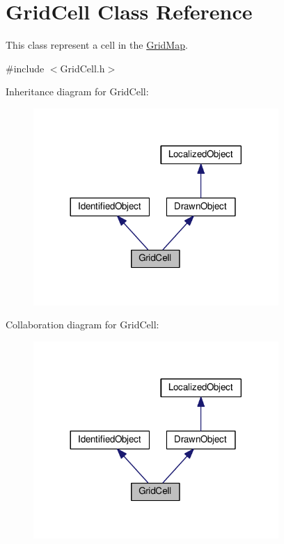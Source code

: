 \hypertarget{classGridCell}{}\section{Grid\+Cell Class Reference}
\label{classGridCell}


This class represent a cell in the \hyperlink{classGridMap}{Grid\+Map}.  




{\ttfamily \#include $<$Grid\+Cell.\+h$>$}



Inheritance diagram for Grid\+Cell\+:\nopagebreak
\begin{figure}[H]
\begin{center}
\leavevmode
\includegraphics[width=264pt]{classGridCell__inherit__graph}
\end{center}
\end{figure}


Collaboration diagram for Grid\+Cell\+:\nopagebreak
\begin{figure}[H]
\begin{center}
\leavevmode
\includegraphics[width=264pt]{classGridCell__coll__graph}
\end{center}
\end{figure}
